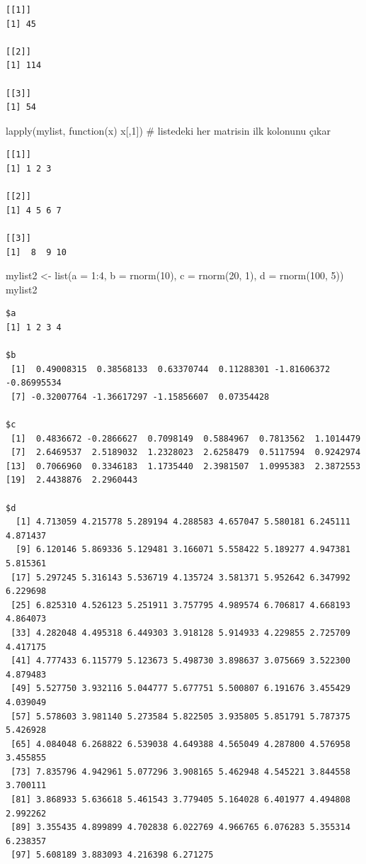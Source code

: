 \documentclass[
  letterpaper,
  DIV=11,
  numbers=noendperiod]{scrreprt}
\newenvironment{Shaded}{\begin{snugshade}}{\end{snugshade}}
\newcommand{\AttributeTok}[1]{\textcolor[rgb]{0.40,0.45,0.13}{#1}}
\newcommand{\CommentTok}[1]{\textcolor[rgb]{0.37,0.37,0.37}{#1}}
\newcommand{\ControlFlowTok}[1]{\textcolor[rgb]{0.00,0.23,0.31}{#1}}
\newcommand{\DecValTok}[1]{\textcolor[rgb]{0.68,0.00,0.00}{#1}}
\newcommand{\FunctionTok}[1]{\textcolor[rgb]{0.28,0.35,0.67}{#1}}
\newcommand{\NormalTok}[1]{\textcolor[rgb]{0.00,0.23,0.31}{#1}}
\newcommand{\OtherTok}[1]{\textcolor[rgb]{0.00,0.23,0.31}{#1}}
\newcommand{\SpecialCharTok}[1]{\textcolor[rgb]{0.37,0.37,0.37}{#1}}
\begin{document}
\begin{verbatim}
[[1]]
[1] 45

[[2]]
[1] 114

[[3]]
[1] 54
\end{verbatim}

\begin{Shaded}
\begin{Highlighting}[]
\FunctionTok{lapply}\NormalTok{(mylist, }\ControlFlowTok{function}\NormalTok{(x) x[,}\DecValTok{1}\NormalTok{]) }\CommentTok{\# listedeki her matrisin ilk kolonunu çıkar}
\end{Highlighting}
\end{Shaded}

\begin{verbatim}
[[1]]
[1] 1 2 3

[[2]]
[1] 4 5 6 7

[[3]]
[1]  8  9 10
\end{verbatim}

\begin{Shaded}
\begin{Highlighting}[]
\NormalTok{mylist2 }\OtherTok{\textless{}{-}} \FunctionTok{list}\NormalTok{(}\AttributeTok{a =} \DecValTok{1}\SpecialCharTok{:}\DecValTok{4}\NormalTok{, }\AttributeTok{b =} \FunctionTok{rnorm}\NormalTok{(}\DecValTok{10}\NormalTok{), }\AttributeTok{c =} \FunctionTok{rnorm}\NormalTok{(}\DecValTok{20}\NormalTok{, }\DecValTok{1}\NormalTok{), }\AttributeTok{d =} \FunctionTok{rnorm}\NormalTok{(}\DecValTok{100}\NormalTok{, }\DecValTok{5}\NormalTok{))}
\NormalTok{mylist2}
\end{Highlighting}
\end{Shaded}

\begin{verbatim}
$a
[1] 1 2 3 4

$b
 [1]  0.49008315  0.38568133  0.63370744  0.11288301 -1.81606372 -0.86995534
 [7] -0.32007764 -1.36617297 -1.15856607  0.07354428

$c
 [1]  0.4836672 -0.2866627  0.7098149  0.5884967  0.7813562  1.1014479
 [7]  2.6469537  2.5189032  1.2328023  2.6258479  0.5117594  0.9242974
[13]  0.7066960  0.3346183  1.1735440  2.3981507  1.0995383  2.3872553
[19]  2.4438876  2.2960443

$d
  [1] 4.713059 4.215778 5.289194 4.288583 4.657047 5.580181 6.245111 4.871437
  [9] 6.120146 5.869336 5.129481 3.166071 5.558422 5.189277 4.947381 5.815361
 [17] 5.297245 5.316143 5.536719 4.135724 3.581371 5.952642 6.347992 6.229698
 [25] 6.825310 4.526123 5.251911 3.757795 4.989574 6.706817 4.668193 4.864073
 [33] 4.282048 4.495318 6.449303 3.918128 5.914933 4.229855 2.725709 4.417175
 [41] 4.777433 6.115779 5.123673 5.498730 3.898637 3.075669 3.522300 4.879483
 [49] 5.527750 3.932116 5.044777 5.677751 5.500807 6.191676 3.455429 4.039049
 [57] 5.578603 3.981140 5.273584 5.822505 3.935805 5.851791 5.787375 5.426928
 [65] 4.084048 6.268822 6.539038 4.649388 4.565049 4.287800 4.576958 3.455855
 [73] 7.835796 4.942961 5.077296 3.908165 5.462948 4.545221 3.844558 3.700111
 [81] 3.868933 5.636618 5.461543 3.779405 5.164028 6.401977 4.494808 2.992262
 [89] 3.355435 4.899899 4.702838 6.022769 4.966765 6.076283 5.355314 6.238357
 [97] 5.608189 3.883093 4.216398 6.271275
\end{verbatim}
\end{document}
